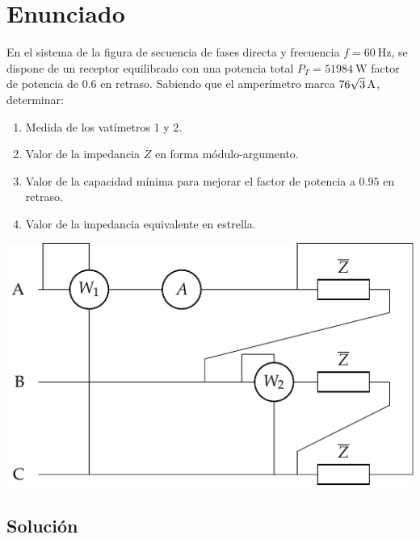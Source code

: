 \section{Enunciado}

\begin{minipage}{0.595\textwidth}
  En el sistema de la figura de secuencia de fases directa y frecuencia
  $f=\qty{60}{\hertz}$, se dispone de un receptor equilibrado con una
  potencia total $P_T=\qty{51984}{\watt}$ factor de potencia de $0.6$ en
  retraso. Sabiendo que el amperímetro marca
  $\qty[parse-numbers=false]{76\sqrt{3}}{\ampere}$, determinar:
  \begin{enumerate}
  \item Medida de los vatímetros 1 y 2.
  \item Valor de la impedancia $\overline{Z}$ en forma módulo-argumento.
  \item Valor de la capacidad mínima para mejorar el factor de potencia
    a $0.95$ en retraso.
  \item Valor de la impedancia equivalente en estrella.
  \end{enumerate}
\end{minipage}
\begin{minipage}{0.395\textwidth}
    \includegraphics[width=\linewidth]{figuras/dosvat_triangulo.pdf}
\end{minipage}


\subsection*{Solución}

